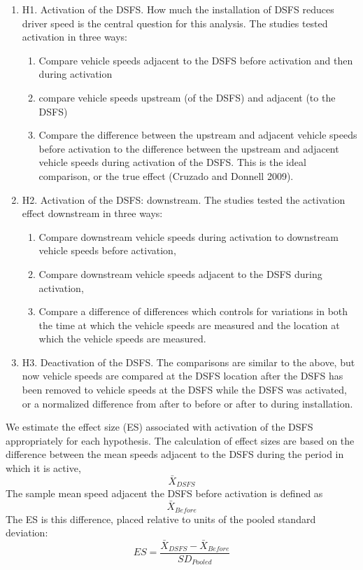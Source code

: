 \documentclass[]{article}
\providecommand{\tightlist}{%
  \setlength{\itemsep}{0pt}\setlength{\parskip}{0pt}}
\begin{document}
\begin{enumerate}
\def\labelenumi{\arabic{enumi}.}
\tightlist
\item
  H1. Activation of the DSFS. How much the installation of DSFS reduces
  driver speed is the central question for this analysis. The studies
  tested activation in three ways:

  \begin{enumerate}
  \def\labelenumii{\alph{enumii}.}
  \tightlist
  \item
    Compare vehicle speeds adjacent to the DSFS before activation and
    then during activation
  \item
    compare vehicle speeds upstream (of the DSFS) and adjacent (to the
    DSFS)
  \item
    Compare the difference between the upstream and adjacent vehicle
    speeds before activation to the difference between the upstream and
    adjacent vehicle speeds during activation of the DSFS. This is the
    ideal comparison, or the true effect (Cruzado and Donnell 2009).
  \end{enumerate}
\item
  H2. Activation of the DSFS: downstream. The studies tested the
  activation effect downstream in three ways:

  \begin{enumerate}
  \def\labelenumii{\alph{enumii}.}
  \tightlist
  \item
    Compare downstream vehicle speeds during activation to downstream
    vehicle speeds before activation,
  \item
    Compare downstream vehicle speeds adjacent to the DSFS during
    activation,
  \item
    Compare a difference of differences which controls for variations in
    both the time at which the vehicle speeds are measured and the
    location at which the vehicle speeds are measured.
  \end{enumerate}
\item
  H3. Deactivation of the DSFS. The comparisons are similar to the
  above, but now vehicle speeds are compared at the DSFS location after
  the DSFS has been removed to vehicle speeds at the DSFS while the DSFS
  was activated, or a normalized difference from after to before or
  after to during installation.
\end{enumerate}

We estimate the effect size (ES) associated with activation of the DSFS
appropriately for each hypothesis. The calculation of effect sizes are
based on the difference between the mean speeds adjacent to the DSFS
during the period in which it is active, \[\bar{X}_{DSFS}\] The sample
mean speed adjacent the DSFS before activation is defined as
\[ \bar{X}_{Before} \] The ES is this difference, placed relative to
units of the pooled standard deviation:
\[ ES = \frac{\bar{X}_{DSFS} - \bar{X}_{Before}}{SD_{Pooled}} \]
\end{document}

